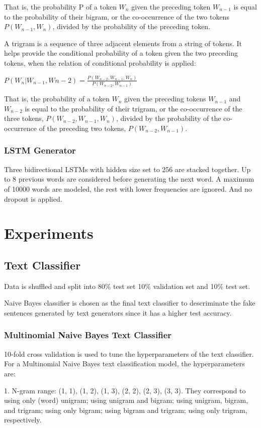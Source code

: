 \documentclass{article}
\begin{document}
That is, the probability P of a token $W_n$ given the preceding token $W_{n-1}$ is equal to the probability of their bigram, or the co-occurrence of the two tokens $P(W_{n-1}, W_n)$, divided by the probability of the preceding token.

A trigram is a sequence of three adjacent elements from a string of tokens. It helps provide the conditional probability of a token given the two preceding tokens, when the relation of conditional probability is applied:

$P(W_n | W_{n-1}, W{n-2}) = \frac{P(W_{n-2}, W_{n-1}, W_n)}{P(W_{n-2}, W_{n-1})}$

That is, the probability of a token $W_n$ given the preceding tokens $W_{n-1}$ and $W_{n-2}$ is equal to the probability of their trigram, or the co-occurrence of the three tokens,  $P(W_{n-2}, W_{n-1}, W_n)$, divided by the probability of the co-occurrence of the preceding two tokens,  $P(W_{n-2}, W_{n-1})$.

\subsubsection{LSTM Generator}
Three bidirectional LSTMs with hidden size set to 256 are stacked together. Up to 8 previous words are considered before generating the next word. A maximum of 10000 words are modeled, the rest with lower frequencies are ignored. And no dropout is applied.
\section{Experiments}
\subsection{Text Classifier}
Data is shuffled and split into 80\% test set 10\% validation set and 10\% test set.

Naive Bayes classifier is chosen as the final text classifier to descriminate the fake sentences generated by text generators since it has a higher test accuracy.
\subsubsection{Multinomial Naive Bayes Text Classifier}
10-fold cross validation is used to tune the hyperparameters of the text classifier. For a Multinomial Naive Bayes text classification model, the hyperparameters are:  

1. N-gram range: (1, 1), (1, 2), (1, 3), (2, 2), (2, 3), (3, 3). They correspond to using only (word) unigram; using unigram and bigram; using unigram, bigram, and trigram; using only bigram; using bigram and trigram; using only trigram, respectively.  
\end{document}
